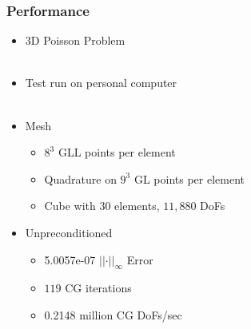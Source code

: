 \documentclass{beamer}
\begin{document}
\begin{frame}
\begin{center}
\frametitle{Performance}

\begin{itemize}

\item $3$D Poisson Problem\\

~\\

\item Test run on personal computer\\

~\\

\item Mesh

\begin{itemize}

\item $8^3$ GLL points per element

\item Quadrature on $9^3$ GL points per element

\item Cube with $30$ elements, $11,880$ DoFs

\end{itemize}

\end{itemize}

{\small

\setlength\columnsep{1pt}

\begin{multicols}{2}

\begin{itemize}

\setlength{\leftmarginii}{1em}

\item Unpreconditioned

\begin{itemize}

\item 5.0057e-07 \hfill $\lvert \lvert \cdot \rvert \rvert_\infty$ Error \hspace{1em}

\item $119$ \hfill CG iterations \hspace{1em}

\item 0.2148 million \hfill CG DoFs/sec \hspace{1em}


\end{itemize}
\end{itemize}
\end{multicols}}
\end{center}
\end{frame}
\end{document}
